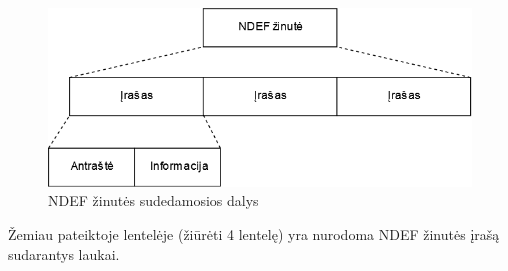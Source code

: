 \begin{figure}[H]
    \centering
    \includegraphics[scale=0.5]{images/NDEF}
    \caption{NDEF žinutės sudedamosios dalys} 
\end{figure}


Žemiau pateiktoje lentelėje (žiūrėti 4 lentelę) yra nurodoma NDEF žinutės įrašą sudarantys laukai. 

